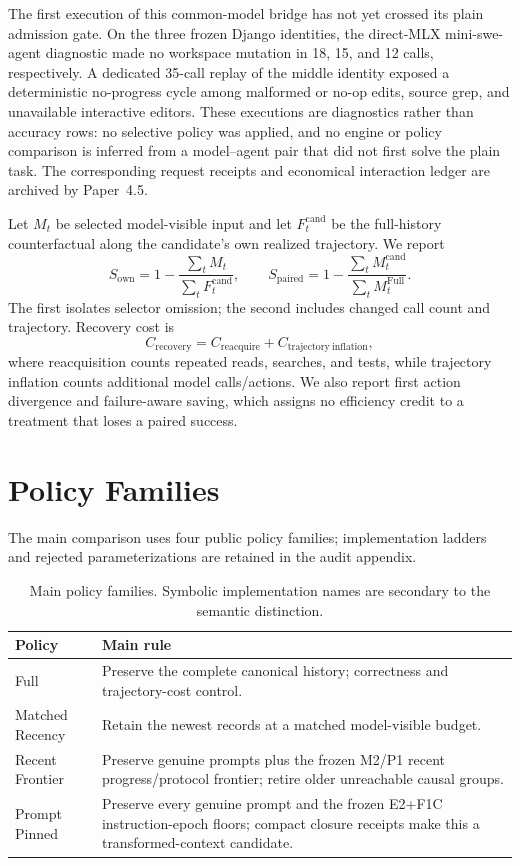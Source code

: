 \documentclass[11pt]{article}
\begin{document}
The first execution of this common-model bridge has not yet crossed its plain
admission gate.  On the three frozen Django identities, the direct-MLX
mini-swe-agent diagnostic made no workspace mutation in 18, 15, and 12 calls,
respectively.  A dedicated 35-call replay of the middle identity exposed a
deterministic no-progress cycle among malformed or no-op edits, source grep,
and unavailable interactive editors.  These executions are diagnostics rather
than accuracy rows: no selective policy was applied, and no engine or policy
comparison is inferred from a model--agent pair that did not first solve the
plain task.  The corresponding request receipts and economical interaction
ledger are archived by Paper~4.5.

Let $M_t$ be selected model-visible input and let $F_t^{\mathrm{cand}}$ be the
full-history counterfactual along the candidate's own realized trajectory.  We
report
\[
S_{\mathrm{own}}=1-\frac{\sum_tM_t}{\sum_tF_t^{\mathrm{cand}}},
\qquad
S_{\mathrm{paired}}=1-
\frac{\sum_tM_t^{\mathrm{cand}}}{\sum_tM_t^{\mathrm{Full}}}.
\]
The first isolates selector omission; the second includes changed call count
and trajectory.  Recovery cost is
\[
C_{\mathrm{recovery}}=C_{\mathrm{reacquire}}+
C_{\mathrm{trajectory\ inflation}},
\]
where reacquisition counts repeated reads, searches, and tests, while trajectory
inflation counts additional model calls/actions.  We also report first action
divergence and failure-aware saving, which assigns no efficiency credit to a
treatment that loses a paired success.

\section{Policy Families}

The main comparison uses four public policy families; implementation ladders
and rejected parameterizations are retained in the audit appendix.

\begin{table}[H]
\centering
\small
\begin{tabular}{p{.18\linewidth}p{.72\linewidth}}
\toprule
Policy & Main rule \\
\midrule
Full & Preserve the complete canonical history; correctness and trajectory-cost control. \\
Matched Recency & Retain the newest records at a matched model-visible budget. \\
Recent Frontier & Preserve genuine prompts plus the frozen M2/P1 recent progress/protocol frontier; retire older unreachable causal groups. \\
Prompt Pinned & Preserve every genuine prompt and the frozen E2+F1C instruction-epoch floors; compact closure receipts make this a transformed-context candidate. \\
\bottomrule
\end{tabular}
\caption{Main policy families. Symbolic implementation names are secondary to
the semantic distinction.}
\label{tab:editorial-policy-families}
\end{table}
\end{document}
